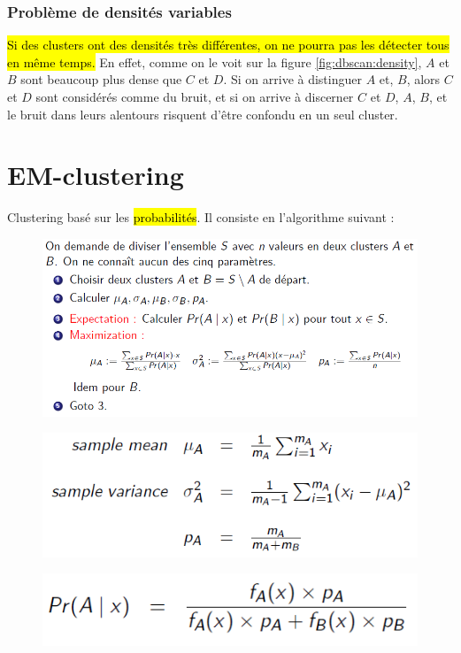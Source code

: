 \documentclass[letterpaper, 12pt]{article}
\newcommand{\alinea}{
\hspace*{0.5cm}}
\begin{document}
			\subsubsection{Problème de densités variables}
				\alinea \hl{Si des clusters ont des densités très différentes,
					on ne pourra pas les détecter tous en même temps.}
					En effet, comme on le voit sur la figure 
					\ref{fig:dbscan:density}, $A$ et $B$ sont beaucoup plus
					dense que $C$ et $D$. Si on arrive à distinguer $A$ et, 
					$B$, alors $C$ et $D$ sont considérés comme du bruit, 
					et si on arrive à discerner $C$ et $D$, $A$, $B$, et 
					le bruit dans leurs alentours risquent d'être confondu
					en un seul cluster.
	\section{EM-clustering}
		\alinea Clustering basé sur les \hl{probabilités}. Il consiste 
			en l'algorithme suivant :
		\begin{figure}[H]
			\centering
			\includegraphics[scale=0.65]{Images/EM_algo.png}
		\end{figure}\noindent
		\begin{figure}[H]
			\centering
			\includegraphics[scale=0.65]{Images/EM_param.png}
		\end{figure}\noindent
		\vspace*{-1.5cm}
		\begin{figure}[H]
			\centering
			\includegraphics[scale=0.65]{Images/EM_a.png}
		\end{figure}\noindent
\end{document}
